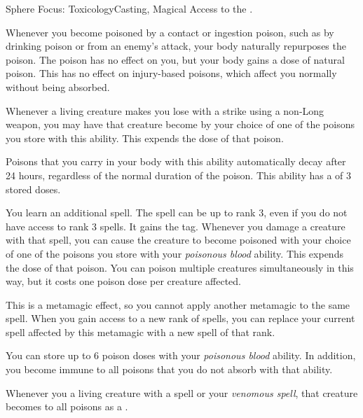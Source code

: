   \begin{magicalfeat}{Sphere Focus: Toxicology}{Casting, Magical}
    \featpre Access to the  .

     Whenever you become poisoned by a contact or ingestion poison, such as by drinking poison or from an enemy's attack, your body naturally repurposes the poison.
    The poison has no effect on you, but your body gains a dose of natural poison.
    This has no effect on injury-based poisons, which affect you normally without being absorbed.

    Whenever a living creature makes you lose  with a  strike using a non-Long weapon, you may have that creature become  by your choice of one of the poisons you store with this ability.
    This expends the dose of that poison.

    Poisons that you carry in your body with this ability automatically decay after 24 hours, regardless of the normal duration of the poison.
    This ability has a  of 3 stored doses.

     You learn an additional spell.
    The spell can be up to rank 3, even if you do not have access to rank 3 spells.
    It gains the \atPoison tag.
    Whenever you damage a creature with that spell, you can cause the creature to become poisoned with your choice of one of the poisons you store with your \textit{poisonous blood} ability.
    This expends the dose of that poison.
    You can poison multiple creatures simultaneously in this way, but it costs one poison dose per creature affected.

    This is a metamagic effect, so you cannot apply another metamagic to the same spell.
    When you gain access to a new rank of spells, you can replace your current spell affected by this metamagic with a new spell of that rank.

     You can store up to 6 poison doses with your \textit{poisonous blood} ability.
    In addition, you become immune to all poisons that you do not absorb with that ability.

     Whenever you  a living creature with a  spell or your \textit{venomous spell}, that creature becomes \vulnerable to all poisons as a .
  \end{magicalfeat}

